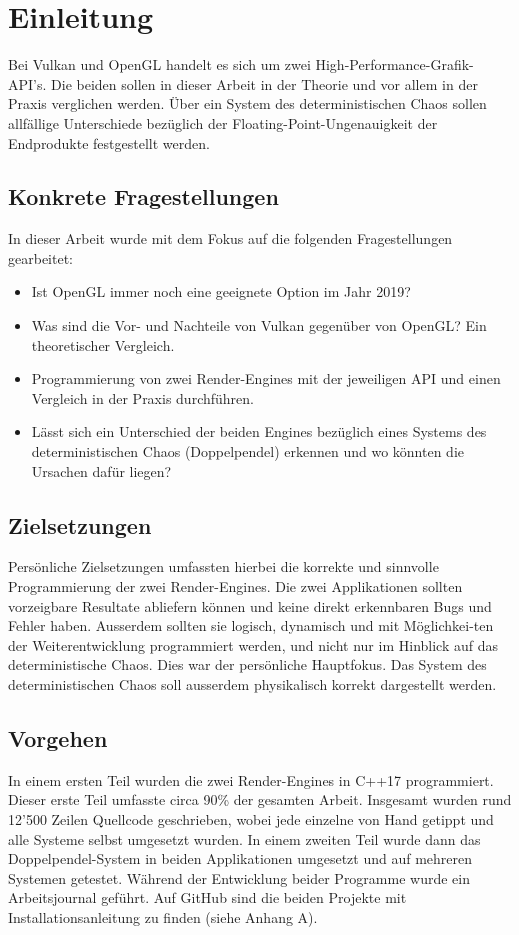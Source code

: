 \documentclass[titlepage, 11pt, a4paper, ngerman]{article}
\begin{document}
\newpage
\section{Einleitung}
Bei Vulkan und OpenGL handelt es sich um zwei High-Performance-Grafik-\acrshort{API}'s. Die beiden sollen in dieser Arbeit in der Theorie und vor allem in der Praxis verglichen werden. Über ein System des deterministischen Chaos sollen allfällige Unterschiede bezüglich der \gls{Floating-Point}-Ungenauigkeit der Endprodukte festgestellt werden.

\subsection{Konkrete Fragestellungen}
In dieser Arbeit wurde mit dem Fokus auf die folgenden Fragestellungen gearbeitet:
\begin{itemize}
    \item Ist \acrshort{OpenGL} immer noch eine geeignete Option im Jahr 2019?
    \item Was sind die Vor- und Nachteile von Vulkan gegenüber von \acrshort{OpenGL}? Ein theoretischer Vergleich.
    \item Programmierung von zwei Render-Engines mit der jeweiligen \acrshort{API} und einen Vergleich in der Praxis durchführen.
    \item Lässt sich ein Unterschied der beiden \glspl{Engine} bezüglich eines Systems des deterministischen Chaos (Doppelpendel) erkennen und wo könnten die Ursachen dafür liegen?
\end{itemize}


\subsection{Zielsetzungen}
Persönliche Zielsetzungen umfassten hierbei die korrekte und sinnvolle Programmierung der zwei Render-\glspl{Engine}. Die zwei Applikationen sollten vorzeigbare Resultate abliefern können und keine direkt erkennbaren Bugs und Fehler haben. Ausserdem sollten sie logisch, dynamisch und mit Möglichkei-ten der Weiterentwicklung programmiert werden, und nicht nur im Hinblick auf das deterministische Chaos. Dies war der persönliche Hauptfokus. Das System des deterministischen Chaos soll ausserdem physikalisch korrekt dargestellt werden.

\subsection{Vorgehen}
In einem ersten Teil wurden die zwei Render-\glspl{Engine} in C++17 programmiert. Dieser erste Teil umfasste circa 90\% der gesamten Arbeit. Insgesamt wurden rund 12'500 Zeilen Quellcode geschrieben, wobei jede einzelne von Hand getippt und alle Systeme selbst umgesetzt wurden. In einem zweiten Teil wurde dann das Doppelpendel-System in beiden Applikationen umgesetzt und auf mehreren Systemen getestet. Während der Entwicklung beider Programme wurde ein Arbeitsjournal geführt. Auf \gls{GitHub} sind die beiden Projekte mit Installationsanleitung zu finden (siehe Anhang A).
\end{document}
